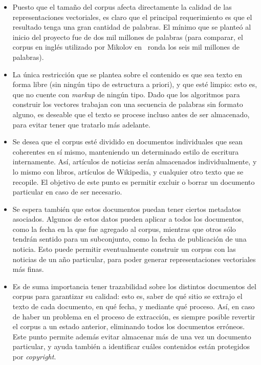 \begin{itemize}

\item Puesto que el tamaño del corpus afecta directamente la calidad de las representaciones
vectoriales, es claro que el principal requerimiento es que el resultado tenga una gran cantidad de
palabras. El mínimo que se planteó al inicio del proyecto fue de dos mil millones de palabras (para
comparar, el corpus en inglés utilizado por Mikolov en~\cite{Mikolov2013c} ronda los seis mil
millones de palabras).

\item La única restricción que se plantea sobre el contenido es que sea texto en forma libre (sin
ningún tipo de estructura a priori), y que esté limpio: esto es, que no cuente con \textit{markup}
de ningún tipo. Dado que los algoritmos para construir los vectores trabajan con una secuencia de
palabras sin formato alguno, es deseable que el texto se procese incluso antes de ser almacenado,
para evitar tener que tratarlo más adelante.

\item Se desea que el corpus esté dividido en documentos individuales que sean coherentes en sí
mismo, manteniendo un determinado estilo de escritura internamente. Así, artículos de noticias serán
almacenados individualmente, y lo mismo con libros, artículos de Wikipedia, y cualquier otro texto
que se recopile. El objetivo de este punto es permitir excluir o borrar un documento particular en
caso de ser necesario.

\item Se espera también que estos documentos puedan tener ciertos metadatos asociados. Algunos de
estos datos pueden aplicar a todos los documentos, como la fecha en la que fue agregado al corpus,
mientras que otros sólo tendrán sentido para un subconjunto, como la fecha de publicación de una
noticia. Esto puede permitir eventualmente construir un corpus con las noticias de un año
particular, para poder generar representaciones vectoriales más finas.

\item Es de suma importancia tener trazabilidad sobre los distintos documentos del corpus para
garantizar su calidad: esto es, saber de qué sitio se extrajo el texto de cada documento, en qué
fecha, y mediante qué proceso. Así, en caso de haber un problema en el proceso de extracción, es
siempre posible revertir el corpus a un estado anterior, eliminando todos los documentos
erróneos. Este punto permite además evitar almacenar más de una vez un documento particular, y ayuda
también a identificar cuáles contenidos están protegidos por \textit{copyright}.


\end{itemize}
